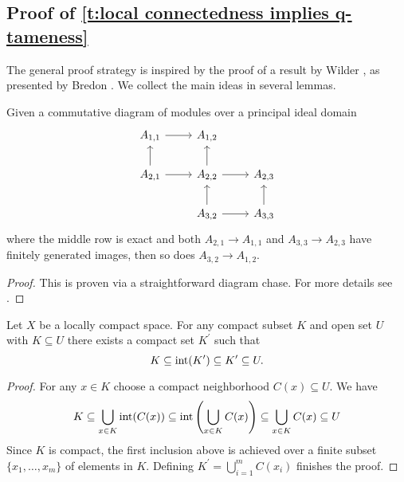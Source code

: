 \subsection{Proof of \cref{t:local connectedness implies q-tameness}}

The general proof strategy is inspired by the proof of a result by Wilder \cite[p.~325]{Wilder.1949}, as presented by Bredon \cite[Section II.17]{Bredon.1997}.
We collect the main ideas in several lemmas.

\begin{lem} \label{l:commutative algebra}
	Given a commutative diagram of modules over a principal ideal domain
	\begin{equation*}
	\begin{tikzcd}
	A_{1,1} \arrow[r] & A_{1,2} & \\
	A_{2,1} \arrow[r] \arrow[u] & A_{2,2} \arrow[r] \arrow[u] & A_{2,3} \\
	& A_{3,2} \arrow[r] \arrow[u] & A_{3,3} \arrow[u]
	\end{tikzcd}
	\end{equation*}
	where the middle row is exact and both $A_{2,1} \to A_{1,1}$ and $A_{3,3} \to A_{2,3}$ have finitely generated images, then so does $A_{3,2} \to A_{1,2}$.
\end{lem}

\begin{proof}
	This is proven via a straightforward diagram chase.
	For more details see \cite[Lemma II.17.3]{Bredon.1997}.
\end{proof}

\begin{lem} \label{l:neighborhood third}
	Let $X$ be a locally compact space.
	For any compact subset $K$ and open set $U$ with $K \subseteq U$ there exists a compact set $K^\prime$ such that
	\begin{equation*}
	K \subseteq \operatorname{int}(K^\prime) \subseteq K^\prime \subseteq U.
	\end{equation*}
\end{lem}

\begin{proof}
	For any $x \in K$ choose a compact neighborhood $C(x) \subseteq U$.
	We have
	\begin{equation*}
	K \subseteq \bigcup_{x \in K} \operatorname{int}(C(x)) \subseteq \operatorname{int}\left(\bigcup_{x \in K} C(x)\right) \subseteq \bigcup_{x \in K} C(x) \subseteq U
	\end{equation*}
	Since $K$ is compact, the first inclusion above is achieved over a finite subset $\{x_1, \dots, x_m\}$ of elements in $K$.
	Defining $K^\prime = \bigcup_{i=1}^m C(x_i)$ finishes the proof.
\end{proof}

